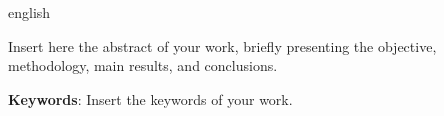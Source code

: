 \begin{resumo}[Abstract]
 \begin{otherlanguage*}{english}

Insert here the abstract of your work, briefly presenting the objective, methodology, main results, and conclusions.

\vspace{\onelineskip}
\noindent \textbf{Keywords}: Insert the keywords of your work.
 
 \end{otherlanguage*}
\end{resumo}